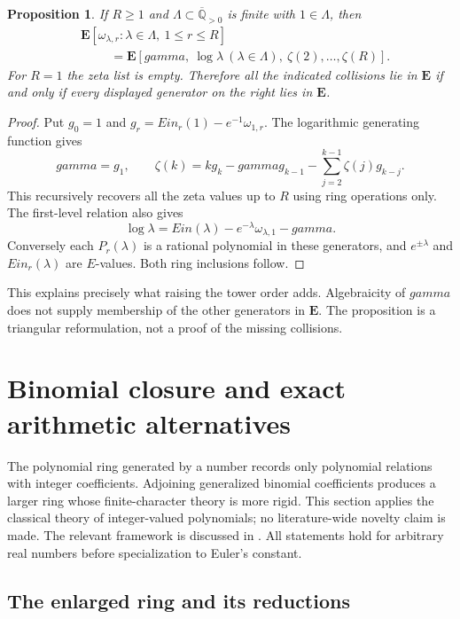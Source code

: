 \documentclass[11pt,a4paper]{article}
\newcommand{\QB}{\overline{\mathbb Q}}
\newcommand{\E}{\mathbf E}
\DeclareMathOperator{\Ein}{Ein}
\newtheorem{proposition}[theorem]{Proposition}
\theoremstyle{definition}
\theoremstyle{remark}
\theoremstyle{plain}
\numberwithin{equation}{section}
\def\Ein{Ein}\def\gamma{gamma}\def\delta{delta}\def\eta{eta}%
\begin{document}
\begin{proposition}\label{ra:prop:ring}
If $R\ge1$ and $\Lambda\subset\QB_{>0}$ is finite with $1\in\Lambda$, then
\begin{align*}
 &\E[\omega_{\lambda,r}:\lambda\in\Lambda,\ 1\le r\le R]\\
 &\hspace{1cm}=\E[\gamma,\ \log\lambda\ (\lambda\in\Lambda),\ \zeta(2),\ldots,\zeta(R)].
\end{align*}
For $R=1$ the zeta list is empty. Therefore all the indicated collisions lie in $\E$ if and only if every displayed generator on the right lies in $\E$.
\end{proposition}
\begin{proof}
Put $g_0=1$ and $g_r=\Ein_r(1)-e^{-1}\omega_{1,r}$. The logarithmic generating function gives
\[
 \gamma=g_1,\qquad
 \zeta(k)=kg_k-\gamma g_{k-1}-\sum_{j=2}^{k-1}\zeta(j)g_{k-j}.
\]
This recursively recovers all the zeta values up to $R$ using ring operations only. The first-level relation also gives
\[
 \log\lambda=\Ein(\lambda)-e^{-\lambda}\omega_{\lambda,1}-\gamma.
\]
Conversely each $P_r(\lambda)$ is a rational polynomial in these generators, and $e^{\pm\lambda}$ and $\Ein_r(\lambda)$ are $E$-values. Both ring inclusions follow.
\end{proof}
This explains precisely what raising the tower order adds. Algebraicity of $\gamma$ does not supply membership of the other generators in $\E$. The proposition is a triangular reformulation, not a proof of the missing collisions.

\section{Binomial closure and exact arithmetic alternatives}
\label{ra:bin:section}

The polynomial ring generated by a number records only polynomial
relations with integer coefficients.  Adjoining generalized binomial
coefficients produces a larger ring whose finite-character theory is
more rigid.  This section applies the classical theory of
integer-valued polynomials; no literature-wide novelty claim is made.
The relevant framework is discussed in \cite{Elliott,Chabert}.
All statements hold for arbitrary real numbers before specialization
to Euler's constant.

\subsection{The enlarged ring and its reductions}
\end{document}
